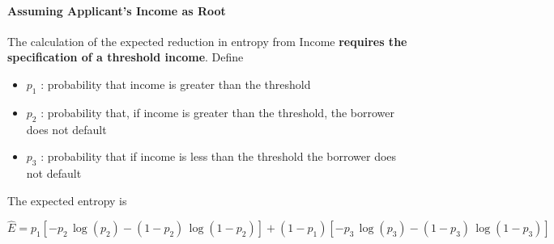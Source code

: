 \documentclass{article}
\providecommand{\tightlist}{%
      \setlength{\itemsep}{0pt}\setlength{\parskip}{0pt}}
\begin{document}
    \paragraph{Assuming Applicant's Income as
Root}\label{assuming-applicants-income-as-root}

    The calculation of the expected reduction in entropy from Income
\textbf{requires the specification of a threshold income}. Define

\begin{itemize}
\tightlist
\item
  \(p_1\) : probability that income is greater than the threshold
\item
  \(p_2\) : probability that, if income is greater than the threshold,
  the borrower does not default
\item
  \(p_3\) : probability that if income is less than the threshold the
  borrower does not default
\end{itemize}

The expected entropy is

\[\hat E = p_1\left[ -p_2 \, \log(p_2) - (1-p_2)\, \log(1-p_2) \right] + (1-p_1)\left[-p_3\, \log(p_3) - (1-p_3)\,\log(1-p_3)\right]\]
\end{document}

